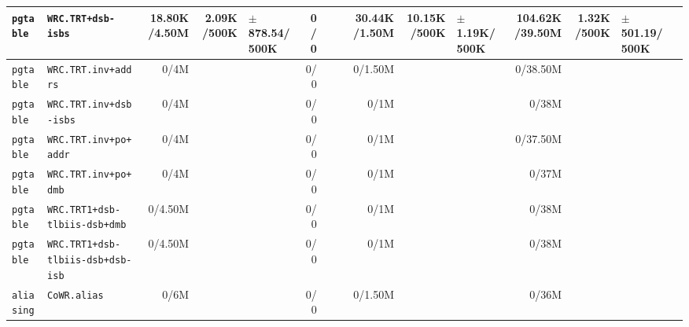 \begin{tabular}{l l  | r r l | r r l | r r l | r r l l}
        \verb|pgtable| &                                     \verb|WRC.TRT+dsb-isbs| &   18.80K/4.50M &            2.09K/500K & $\pm$ 878.54/500K &            0/0 &                       &  &   30.44K/1.50M &           10.15K/500K &  $\pm$ 1.19K/500K & 104.62K/39.50M &            1.32K/500K &  $\pm$ 501.19/500K & \\ \hline 
        \verb|pgtable| &                                    \verb|WRC.TRT.inv+addrs| &           0/4M &                       &                   &            0/0 &                       &  &        0/1.50M &                       &                   &       0/38.50M &                       &                    & \\ \hline 
        \verb|pgtable| &                                 \verb|WRC.TRT.inv+dsb-isbs| &           0/4M &                       &                   &            0/0 &                       &  &           0/1M &                       &                   &          0/38M &                       &                    & \\ \hline 
        \verb|pgtable| &                                  \verb|WRC.TRT.inv+po+addr| &           0/4M &                       &                   &            0/0 &                       &  &           0/1M &                       &                   &       0/37.50M &                       &                    & \\ \hline 
        \verb|pgtable| &                                   \verb|WRC.TRT.inv+po+dmb| &           0/4M &                       &                   &            0/0 &                       &  &           0/1M &                       &                   &          0/37M &                       &                    & \\ \hline 
        \verb|pgtable| &                          \verb|WRC.TRT1+dsb-tlbiis-dsb+dmb| &        0/4.50M &                       &                   &            0/0 &                       &  &           0/1M &                       &                   &          0/38M &                       &                    & \\ \hline 
        \verb|pgtable| &                      \verb|WRC.TRT1+dsb-tlbiis-dsb+dsb-isb| &        0/4.50M &                       &                   &            0/0 &                       &  &           0/1M &                       &                   &          0/38M &                       &                    & \\ \hline 
       \verb|aliasing| &                                           \verb|CoWR.alias| &           0/6M &                       &                   &            0/0 &                       &  &        0/1.50M &                       &                   &          0/36M &                       &                    & \\ \hline 

\end{tabular}
